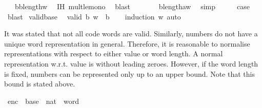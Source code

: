 \begin{isabellebody}
\ {\isachardoublequoteopen}{\isachardot}{\kern0pt}{\isachardot}{\kern0pt}{\isachardot}{\kern0pt}\ {\isasymle}\ b{\isacharasterisk}{\kern0pt}b{\isacharcircum}{\kern0pt}length{\isacharparenleft}{\kern0pt}w{\isacharparenright}{\kern0pt}{\isachardoublequoteclose}\ \isamarkupfalse%
\ IH\ mult{\isacharunderscore}{\kern0pt}le{\isacharunderscore}{\kern0pt}mono{}\ \isamarkupfalse%
\ blast\isanewline
\ \ \isamarkupfalse%
\ \isamarkupfalse%
\ {\isachardoublequoteopen}{\isachardot}{\kern0pt}{\isachardot}{\kern0pt}{\isachardot}{\kern0pt}\ {\isacharequal}{\kern0pt}\ b{\isacharcircum}{\kern0pt}length{\isacharparenleft}{\kern0pt}a{\isacharhash}{\kern0pt}w{\isacharparenright}{\kern0pt}{\isachardoublequoteclose}\ \isamarkupfalse%
\ simp\isanewline
\ \ \isamarkupfalse%
\ \isamarkupfalse%
\ {\isacharquery}{\kern0pt}case\ \isamarkupfalse%
\ blast\isanewline
{}\isamarkupfalse%
%
\endisatagproof
{\isafoldproof}%
%
\isadelimproof
\isanewline
%
\endisadelimproof
\isanewline
{}\isamarkupfalse%
\ valid{\isacharunderscore}{\kern0pt}base{\isacharcolon}{\kern0pt}\isanewline
\ \ {\isachardoublequoteopen}valid\ b\ w\ {\isasymLongrightarrow}\ {}{\isasymle}b{\isachardoublequoteclose}\isanewline
%
\isadelimproof
\ \ %
\endisadelimproof
%
\isatagproof
{}\isamarkupfalse%
\ {\isacharparenleft}{\kern0pt}induction\ w{\isacharparenright}{\kern0pt}\ auto%
\endisatagproof
{\isafoldproof}%
%
\isadelimproof
%
\endisadelimproof
%
\isadelimdocument
%
\endisadelimdocument
%
\isatagdocument
%
\isamarkuptrue%
%
\endisatagdocument
{\isafolddocument}%
%
\isadelimdocument
%
\endisadelimdocument
%
\begin{isamarkuptext}%
It was stated that not all code words are valid. Similarly, numbers do not
  have a unique word representation in general.
Therefore, it is reasonable to normalise representations with respect
  to either value or word length.
A normal representation w.r.t. value is without leading zeroes.
However, if the word length is fixed, numbers can be represented
  only up to an upper bound. Note that this bound is stated above.%
\end{isamarkuptext}\isamarkuptrue%
\isamarkupfalse%
\ enc\ {\isacharcolon}{\kern0pt}{\isacharcolon}{\kern0pt}\ {\isachardoublequoteopen}base\ {\isasymRightarrow}\ nat\ {\isasymRightarrow}\ word{\isachardoublequoteclose}\ \isanewline

\end{isabellebody}
